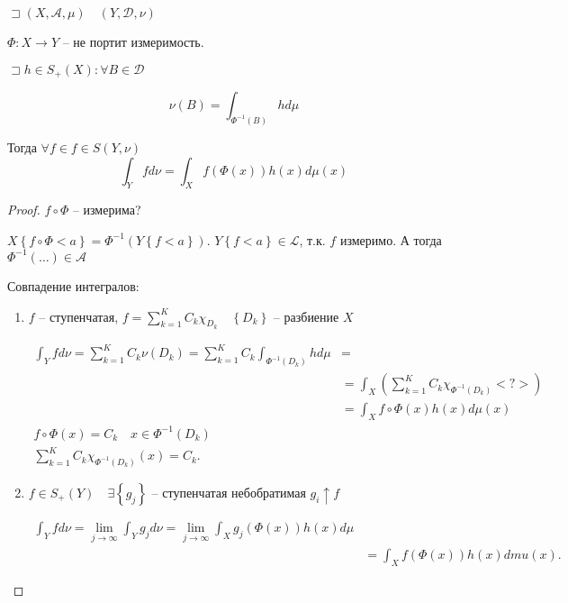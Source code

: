 \begin{theorem}

    $\sqsupset \left( X, \mathscr A, \mu \right) \quad \left( Y, \mathscr{D}, \nu \right) $

    $\Phi: X \to Y$ -- не портит измеримость.

    $\sqsupset h\in S_+(X): \forall B\in \mathscr D$

    \[\nu(B) = \int_{\Phi^{-1}(B)}hd\mu\]

    Тогда $\forall f\in f\in S\left( Y, \nu \right)$
    \[\int_Y fd\nu = \int_X f\left( \Phi(x) \right) h(x) d\mu(x) \]
\end{theorem}
\begin{proof}
    $f\circ \Phi$ -- измерима?

    $X \left\{ f\circ \Phi < a \right\}  = \Phi^{-1}\left( Y\left\{ f<a \right\}  \right) $. $Y\left\{ f<a \right\} \in \mathscr L$, т.к. $f$ измеримо. А тогда  $\Phi^{-1}\left( \ldots \right) \in\mathscr A$ 

    Совпадение интегралов:
    \begin{enumerate}
        \item $f$ -- ступенчатая,  $f = \sum_{k=1}^{K} C_k\chi_{D_k}\quad \left\{ D_k \right\} $ -- разбиение $X$

             \begin{align*}
                 \int_Y fd\nu = \sum_{k=1}^{K} C_k \nu\left( D_k \right)  = \sum_{k=1}^{K} C_k\int_{\Phi^{-1}\left( D_k \right)} h d\mu &=  \\
                 &= \int_X \left( \sum_{k=1}^{K} C_k\chi_{\Phi^{-1}\left( D_k \right)} <?>  \right)  \\
                 &= \int_X f\circ \Phi(x)h(x)d\mu(x) \\
                 f\circ \Phi(x) = C_k\quad x\in \Phi^{-1}(D_k)\\
                 \sum_{k=1}^{K} C_k\chi_{\Phi^{-1}(D_k)}(x) = C_k
             .\end{align*}
         \item $f\in S_+(Y)\quad \exists \left\{ g_{j} \right\} $ -- ступенчатая небобратимая $g_i\uparrow f$

              \begin{align*}
                  \int_Y fd\nu = \lim_{j \to \infty} \int_Yg_jd\nu = \lim_{j \to \infty} \int_X g_j\left( \Phi(x) \right) h(x)d\mu\\
                  &= \int_X f\left( \Phi(x) \right) h(x)dmu(x).
                \end{align*}


\end{enumerate}
\end{proof}
